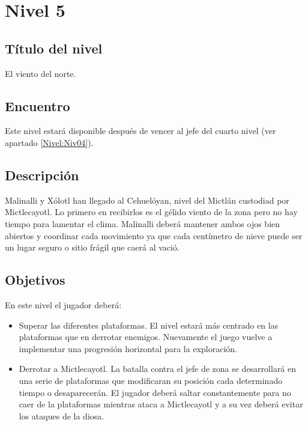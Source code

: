 \section{Nivel 5} \label{Nivel:Niv05}
        \subsection{Título del nivel}
        El viento del norte.
        \subsection{Encuentro}
       Este nivel estará disponible después de vencer al jefe del cuarto nivel (ver apartado \ref{Nivel:Niv04}).
        \subsection{Descripción}
Malinalli y Xólotl han llegado al Cehuelóyan, nivel del Mictlán custodiad por Mictlecayotl. Lo primero en recibirlos es el gélido viento de la zona pero no hay tiempo para lamentar el clima. Malinalli deberá mantener ambos ojos bien abiertos y coordinar cada movimiento ya que cada centímetro de nieve puede ser un lugar seguro o sitio frágil que caerá al vació.      
        \subsection{Objetivos}
En este nivel el jugador deberá:
\begin{itemize}
        \item Superar las diferentes plataformas. El nivel estará más centrado en las plataformas que en derrotar enemigos. Nuevamente el juego vuelve a implementar una progresión horizontal para la exploración. 
        \item  Derrotar a Mictlecayotl. La batalla contra el jefe de zona se desarrollará en una serie de plataformas que modificaran su posición cada determinado tiempo o desaparecerán. El jugador deberá saltar constantemente para no caer de la plataformas mientras ataca a Mictlecayotl y a su vez deberá evitar los ataques de la diosa.
\end{itemize}


